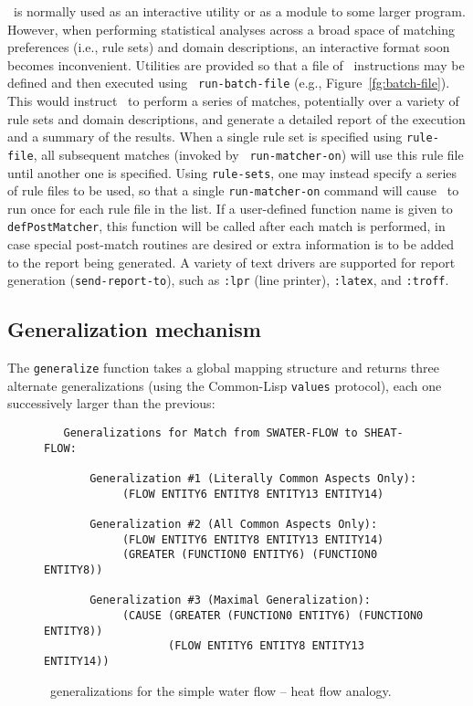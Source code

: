 \SME\ is normally used as an interactive utility or as a module to some
larger program. However, when performing statistical analyses across a broad
space of matching preferences (i.e., rule sets) and domain descriptions, an
interactive format soon becomes inconvenient. Utilities are provided so that
a file of \SME\ instructions may be defined and then executed using {\tt
run-batch-file} (e.g., Figure~\ref{fg:batch-file}). This would instruct
\SME\ to perform a series of matches, potentially over a variety of rule
sets and domain descriptions, and generate a detailed report of the
execution and a summary of the results. When a single rule set is specified
using {\tt rule-file}, all subsequent matches (invoked by {\tt
run-matcher-on}) will use this rule file until another one is specified.
Using {\tt rule-sets}, one may instead specify a series of rule files to be
used, so that a single {\tt run-matcher-on} command will cause \SME\ to run
once for each rule file in the list. If a user-defined function name is
given to {\tt defPostMatcher}, this function will be called after each match
is performed, in case special post-match routines are desired or extra
information is to be added to the report being generated. A variety of text
drivers are supported for report generation ({\tt send-report-to}), such as
{\tt :lpr} (line printer), {\tt :latex}, and {\tt :troff}.


\subsection{Generalization mechanism}

\indent
{}

The {\tt generalize} function takes a global mapping structure and returns
three alternate generalizations (using the Common-Lisp {\tt values}
protocol), each one successively larger than the previous:


\begin{figure}
\border
\begin{small}
\begin{verbatim}
   Generalizations for Match from SWATER-FLOW to SHEAT-FLOW:

       Generalization #1 (Literally Common Aspects Only):
            (FLOW ENTITY6 ENTITY8 ENTITY13 ENTITY14)

       Generalization #2 (All Common Aspects Only):
            (FLOW ENTITY6 ENTITY8 ENTITY13 ENTITY14)
            (GREATER (FUNCTION0 ENTITY6) (FUNCTION0 ENTITY8))

       Generalization #3 (Maximal Generalization):
            (CAUSE (GREATER (FUNCTION0 ENTITY6) (FUNCTION0 ENTITY8))
                   (FLOW ENTITY6 ENTITY8 ENTITY13 ENTITY14))
\end{verbatim}
\end{small}
  \caption{\SME\ generalizations for the simple water flow -- heat flow analogy.}
  \label{fg:generalizations}
\border
\end{figure}


